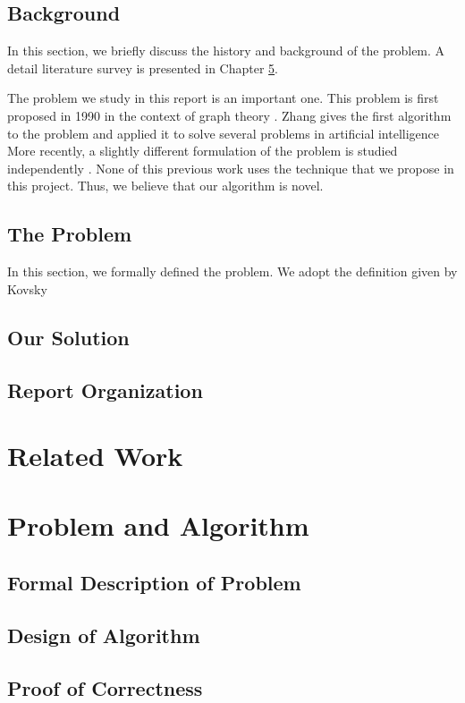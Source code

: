\documentclass[fyp]{socreport}
\begin{document}
\section{Background}
In this section, we briefly discuss the history and background
of the problem.  A detail literature survey is presented in 
Chapter \ref{ch:related}.

The problem we study in this report is an important one.
This problem is first proposed in 1990 in the context
of graph theory \cite{kumar19cbio}.  Zhang gives the
first algorithm to the problem and applied it to solve several 
problems in artificial intelligence   
More recently, a slightly different formulation of the problem
is studied independently \cite{maltoni22fing}.  None of this previous work
uses the technique that we propose in this project.  Thus, we 
believe that our algorithm is novel.

\section{The Problem}
In this section, we formally defined the problem.  We adopt
the definition given by Kovsky 

\section{Our Solution}
\section{Report Organization}

\chapter{Related Work}
\label{ch:related}

\chapter{Problem and Algorithm}
\section{Formal Description of Problem}
\section{Design of Algorithm}
\section{Proof of Correctness}
\end{document}
